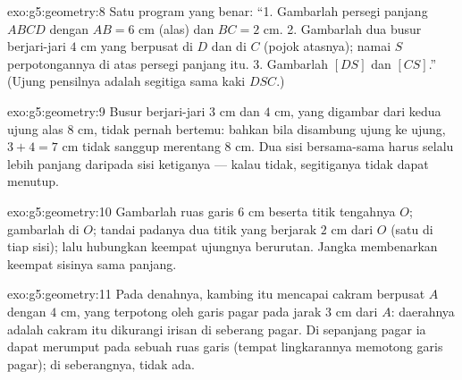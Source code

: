 \begin{solution}{exo:g5:geometry:8}
Satu program yang benar: ``1. Gambarlah persegi panjang $ABCD$
dengan $AB = 6$ cm (alas) dan $BC = 2$ cm. 2. Gambarlah dua busur
berjari-jari $4$ cm yang berpusat di $D$ dan di $C$ (pojok atasnya);
namai $S$ perpotongannya di atas persegi panjang itu. 3. Gambarlah
$[DS]$ dan $[CS]$.'' (Ujung pensilnya adalah segitiga sama kaki $DSC$.)
\end{solution}

\begin{solution}{exo:g5:geometry:9}
Busur berjari-jari $3$ cm dan $4$ cm, yang digambar dari kedua ujung
alas $8$ cm, tidak pernah bertemu: bahkan bila disambung ujung ke
ujung, $3 + 4 = 7$ cm tidak sanggup merentang $8$ cm. Dua sisi
bersama-sama harus selalu lebih panjang daripada sisi ketiganya ---
kalau tidak, segitiganya tidak dapat menutup.
\end{solution}

\begin{solution}{exo:g5:geometry:10}
Gambarlah ruas garis $6$ cm beserta titik tengahnya $O$; gambarlah
 di $O$; tandai padanya dua titik yang berjarak
$2$ cm dari $O$ (satu di tiap sisi); lalu hubungkan keempat ujungnya
berurutan. Jangka membenarkan keempat sisinya sama panjang.
\end{solution}

\begin{solution}{exo:g5:geometry:11}
Pada denahnya, kambing itu mencapai cakram berpusat $A$ dengan
 $4$ cm, yang terpotong oleh garis pagar pada jarak $3$ cm
dari $A$: daerahnya adalah cakram itu dikurangi irisan di seberang
pagar. Di sepanjang pagar ia dapat merumput pada sebuah ruas garis
(tempat lingkarannya memotong garis pagar); di seberangnya, tidak ada.

\end{solution}

